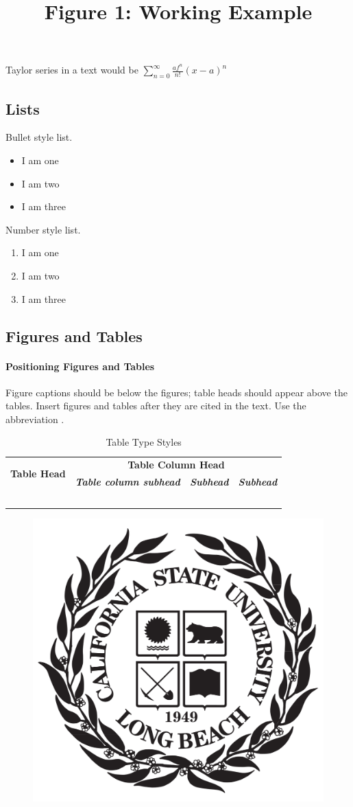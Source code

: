 \documentclass{article}
\begin{document}
Taylor series in a text would be
$\sum_{n=0}^{\infty} \frac{af^n}{n!}(x-a)^n$

\subsection{Lists}
Bullet style list.
\begin{itemize}
    \item I am one
    \item I am two
    \item I am three
\end{itemize}

Number style list.
\begin{enumerate}
    \item I am one
    \item I am two
    \item I am three
\end{enumerate}

\subsection{Figures and Tables}
\paragraph{Positioning Figures and Tables} Figure captions should be below the figures; table heads should appear above the tables. Insert figures and tables after they are cited in the text. Use the abbreviation .

\begin{table}[h]

\caption{Table Type Styles}
\begin{center}
\begin{tabular}{|c||l|l|l|}
  \hline
  \multirow{2}{*}{\textbf{Table Head}} 
      & \multicolumn{3}{c|}{\textbf{Table Column Head}} \\  \cline{2-4}
  & \textbf{\emph{Table column subhead}} & \textbf{\emph{Subhead}} & \textbf{\emph{Subhead}}  \\  \hline
  $$ &  &  &  \\      \hline
\end{tabular}
\label{myTable}
\end{center}
\end{table}

\begin{figure}[h]
\centering
\includegraphics[width=0.4\columnwidth]{fig1.png}
\\\title{Figure 1: Working Example}
\end{figure}
\end{document}
